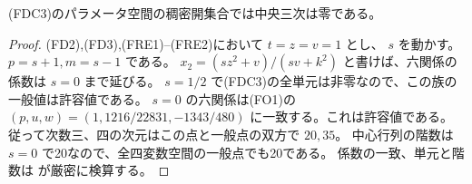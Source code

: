 \begin{corollary}\label{cor:cubic-CY-one-segre-double-split-FDC-generic-zero}
(FDC3)のパラメータ空間の稠密開集合では中央三次は零である。
\end{corollary}
\begin{proof}
(FD2),(FD3),(FRE1)--(FRE2)において $t=z=v=1$ とし、
$s$ を動かす。$p=s+1,m=s-1$ である。
$x_2=(s z^2+v)/(sv+k^2)$ と書けば、六関係の係数は $s=0$ まで延びる。
$s=1/2$ で(FDC3)の全単元は非零なので、この族の一般値は許容値である。
$s=0$ の六関係は(FO1)の
$(p,u,w)=(1,1216/22831,-1343/480)$ に一致する。これは許容値である。
従って次数三、四の次元はこの点と一般点の双方で $20,35$。
中心行列の階数は $s=0$ で20なので、全四変数空間の一般点でも20である。
係数の一致、単元と階数は
 が厳密に検算する。
\end{proof}

